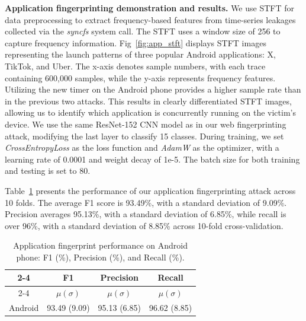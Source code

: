 \textbf{Application fingerprinting demonstration and results.} We use STFT for data preprocessing to extract frequency-based features from time-series leakages collected via the \textit{syncfs} system call. The STFT uses a window size of 256 to capture frequency information. Fig~\ref{fig:app_stft} displays STFT images representing the launch patterns of three popular Android applications: X, TikTok, and Uber. The x-axis denotes sample numbers, with each trace containing 600,000 samples, while the y-axis represents frequency features. Utilizing the new timer on the Android phone provides a higher sample rate than in the previous two attacks. This results in clearly differentiated STFT images, allowing us to identify which application is concurrently running on the victim’s device. We use the same ResNet-152 CNN model as in our web fingerprinting attack, modifying the last layer to classify 15 classes. During training, we set \textit{CrossEntropyLoss} as the loss function and \textit{AdamW} as the optimizer, with a learning rate of 0.0001 and weight decay of 1e-5. The batch size for both training and testing is set to 80.


Table~\ref{tb:app_results} presents the performance of our application fingerprinting attack across 10 folds. The average F1 score is 93.49\%, with a standard deviation of 9.09\%. Precision averages 95.13\%, with a standard deviation of 6.85\%, while recall is over 96\%, with a standard deviation of 8.85\% across 10-fold cross-validation.

\begin{table}[t]
\centering
\caption{Application fingerprint performance on Android phone: F1 (\%), Precision (\%), and Recall (\%).}
\begin{tabular}{c|c|c|c|}
\cline{2-4}
                                  & \textbf{F1}     & \textbf{Precision} & \textbf{Recall} \\ \cline{2-4} 
                                  & \textbf{$ \mu (\sigma)$} & \textbf{$ \mu (\sigma)$}    & \textbf{$ \mu (\sigma)$} \\ \hline \hline
\multicolumn{1}{|c|}{Android} & 93.49 (9.09)  &   95.13 (6.85)     &   96.62 (8.85)  \\ \hline

\end{tabular}
\label{tb:app_results}
\end{table}
